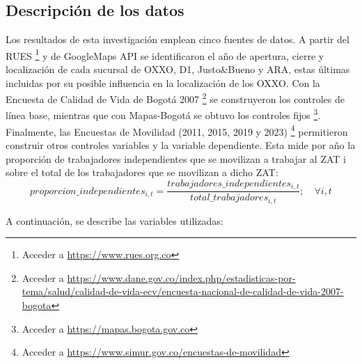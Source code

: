 \documentclass{article}
\begin{document}
\subsection{Descripción de los datos}
Los resultados de esta investigación emplean cinco fuentes de datos. A partir del RUES \footnote{Acceder a \url{ https://www.rues.org.co}} y de GoogleMaps API se identificaron el año de apertura, cierre y localización de cada sucursal de OXXO, D1, Justo\&Bueno y ARA, estas últimas incluidas por su posible influencia en la localización de los OXXO. Con la Encuesta de Calidad de Vida de Bogotá 2007 \footnote{Acceder a \url{https://www.dane.gov.co/index.php/estadisticas-por-tema/salud/calidad-de-vida-ecv/encuesta-nacional-de-calidad-de-vida-2007-bogota}} se construyeron los controles de línea base, mientras que con Mapas-Bogotá se obtuvo los controles fijos \footnote{Acceder a \url{https://mapas.bogota.gov.co}}. Finalmente, las Encuestas de Movilidad (2011, 2015, 2019 y 2023) \footnote{Acceder a \url{https://www.simur.gov.co/encuestas-de-movilidad}} permitieron construir otros controles variables y la variable dependiente. Esta mide por año la proporción de trabajadores independientes que se movilizan a trabajar al ZAT i sobre el total de los trabajadores que se movilizan a dicho ZAT:\\

\begin{equation}
    proporcion\_independientes_{i,t}=\frac{trabajadores\_independientes_{i,t}}{total\_trabajadores_{i,t}} ; \quad \forall i, t
\end{equation}


A continuación, se describe las variables utilizadas:
\end{document}
